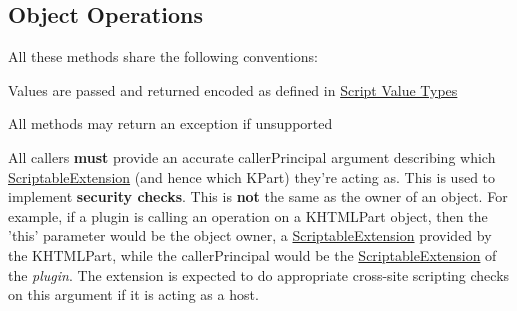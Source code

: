 \subsection*{\-Object \-Operations}
\label{_amgrp60cb1b923af3b22f2c0b4823d5c6a3c1}%
 \-All these methods share the following conventions\-: \begin{DoxyItemize}
\item \-Values are passed and returned encoded as defined in \hyperlink{group__ScriptValueTypes}{\-Script \-Value \-Types} \item \-All methods may return an exception if unsupported \item \-All callers {\bfseries must} provide an accurate caller\-Principal argument describing which \hyperlink{classKParts_1_1ScriptableExtension}{\-Scriptable\-Extension} (and hence which \-K\-Part) they're acting as. \-This is used to implement {\bfseries security checks}. \-This is {\bfseries not} the same as the owner of an object. \-For example, if a plugin is calling an operation on a \-K\-H\-T\-M\-L\-Part object, then the 'this' parameter would be the object owner, a \hyperlink{classKParts_1_1ScriptableExtension}{\-Scriptable\-Extension} provided by the \-K\-H\-T\-M\-L\-Part, while the caller\-Principal would be the \hyperlink{classKParts_1_1ScriptableExtension}{\-Scriptable\-Extension} of the {\itshape plugin\/}. \-The extension is expected to do appropriate cross-\/site scripting checks on this argument if it is acting as a host. \end{DoxyItemize}
